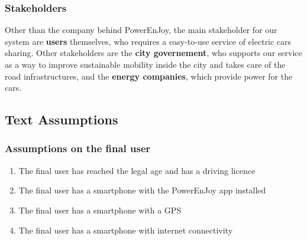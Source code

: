 \documentclass[11pt]{article} %
\newcommand{\pe}{PowerEnJoy }
\newcommand{\pecomma}{PowerEnJoy, }
\begin{document}
\subsubsection{Stakeholders}
Other than the company behind \pecomma the main stakeholder for our system are \textbf{users} themselves, who requires a easy-to-use service of electric cars sharing. Other stakeholders are the \textbf{city governement}, who supports our service as a way to improve sustainable mobility inside the city and takes care of the road infrastructures, and the \textbf{energy companies}, which provide power for the cars.

\subsection{Text Assumptions}

\subsubsection{Assumptions on the final user}
\begin{enumerate}
	\item The final user has reached the legal age and has a driving licence
	\item The final user has a smartphone with the \pe app installed
	\item The final user has a smartphone with a GPS
	\item The final user has a smartphone with internet connectivity
\end{enumerate}
  
\end{document}
